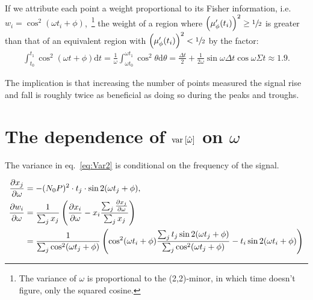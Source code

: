 \documentclass{article}
\newcommand{\td}{\mathrm{d}}
\begin{document}
If we attribute each point a weight proportional to its Fisher information, i.e. $w_i = \cos^2(\omega t_i + \phi)$,~\footnote{The variance of $\omega$ is proportional to the (2,2)-minor, in which time doesn't figure, only the squared cosine.} the weight of a region where $\bkt{\mupp}^2 \geq\sfrac12$ is greater than that of an equivalent region with $\bkt{\mupp}^2 < \sfrac12$  by the factor:
\begin{align*}
	\int_{t_0}^{t_1}\cos^2(\omega t + \phi)\td t = \frac1\omega\int_{\omega t_0}^{\omega t_1} \cos^2\theta\td\theta = \frac{\Delta t}{2} + \frac{1}{2\omega}\sin\omega\Delta t\cos\omega\Sigma t \approx 1.9.
\end{align*}

The implication is that increasing the number of points measured the signal rise and fall is roughly twice as beneficial as doing so during the peaks and troughs.

\section{The dependence of $\var{\hat{\omega}}$ on $\omega$}
The variance in eq.~\eqref{eq:Var2} is conditional on the frequency of the signal. 

\begin{align*}
	\ddw{x_j} &= -(N_0P)^2\cdot t_j\cdot\sin 2(\ang{j}), \\
	\ddw{w_i} &= \frac{1}{\sum_j x_j}\bkt{\ddw{x_i} - x_i\frac{\sum_j\ddw{x_j}}{\sum_j x_j}} \\
			  &= \frac{1}{\sum_j \cos^2(\ang{j})}\bkt{\cos^2(\ang{i})\frac{\sum_j t_j\sin 2(\ang{j})}{\sum_j \cos^2(\ang{j})} - t_i \sin 2(\ang{i})}
\end{align*}
\end{document}
